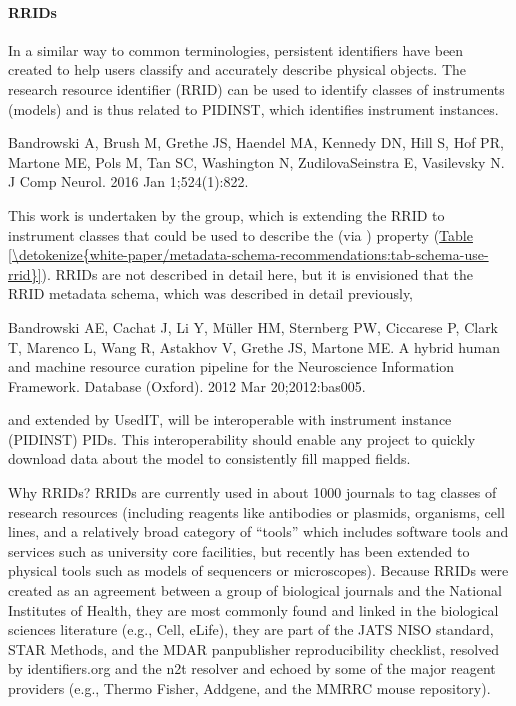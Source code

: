 \documentclass[a4paper,10pt,english]{sphinxmanual}
\begin{document}
\paragraph{RRIDs}
\label{\detokenize{white-paper/metadata-schema-recommendations:rrids}}
\sphinxAtStartPar
In a similar way to common terminologies, persistent identifiers have
been created to help users classify and accurately describe physical
objects.  The research resource identifier (RRID) can be used to
identify classes of instruments (models) and is thus related to
PIDINST, which identifies instrument instances.%
\begin{footnote}[1]\sphinxAtStartFootnote
Bandrowski A, Brush M, Grethe JS, Haendel MA, Kennedy DN, Hill S, Hof
PR, Martone ME, Pols M, Tan SC, Washington N, Zudilova\sphinxhyphen{}Seinstra E,
Vasilevsky N.  J
Comp Neurol. 2016 Jan 1;524(1):8\sphinxhyphen{}22.
%
\end{footnote}
This work is undertaken by the  group, which is extending the
RRID to instrument classes that could be used to describe the 
(via ) property (\hyperref[\detokenize{white-paper/metadata-schema-recommendations:tab-schema-use-rrid}]{Table \ref{\detokenize{white-paper/metadata-schema-recommendations:tab-schema-use-rrid}}}).
RRIDs are not described in detail here, but it is envisioned that the
RRID metadata schema, which was described in detail
previously,%
\begin{footnote}[2]\sphinxAtStartFootnote
Bandrowski AE, Cachat J, Li Y, Müller HM, Sternberg PW, Ciccarese P,
Clark T, Marenco L, Wang R, Astakhov V, Grethe JS, Martone ME. A
hybrid human and machine resource curation pipeline for the
Neuroscience Information Framework. Database (Oxford). 2012 Mar
20;2012:bas005. 
%
\end{footnote} and extended by UsedIT, will be
interoperable with instrument instance (PIDINST) PIDs.  This
interoperability should enable any project to quickly download data
about the model to consistently fill mapped fields.

\sphinxAtStartPar
Why RRIDs? RRIDs are currently used in about 1000 journals to tag
classes of research resources (including reagents like antibodies or
plasmids, organisms, cell lines, and a relatively broad category of
“tools” which includes software tools and services such as university
core facilities, but recently has been extended to physical tools such
as models of sequencers or microscopes).  Because RRIDs were created
as an agreement between a group of biological journals and the
National Institutes of Health, they are most commonly found and linked
in the biological sciences literature (e.g., Cell, eLife), they are
part of the JATS NISO standard, STAR Methods, and the MDAR
pan\sphinxhyphen{}publisher reproducibility checklist, resolved by identifiers.org
and the n2t resolver and echoed by some of the major reagent providers
(e.g., Thermo Fisher, Addgene, and the MMRRC mouse repository).
\end{document}
